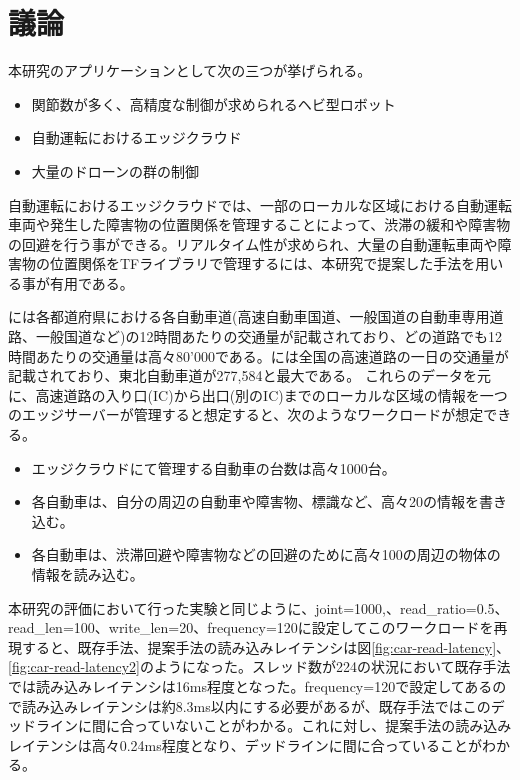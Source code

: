 \documentclass[a4paper]{jreport}	%
\begin{document}
\chapter{議論}
本研究のアプリケーションとして次の三つが挙げられる。
\begin{itemize}
	\item 関節数が多く、高精度な制御が求められるヘビ型ロボット
	\item 自動運転におけるエッジクラウド
	\item 大量のドローンの群の制御
\end{itemize}

自動運転におけるエッジクラウドでは、一部のローカルな区域における自動運転車両や発生した障害物の位置関係を管理することによって、渋滞の緩和や障害物の回避を行う事ができる。リアルタイム性が求められ、大量の自動運転車両や障害物の位置関係をTFライブラリで管理するには、本研究で提案した手法を用いる事が有用である。

\cite{nexco}には各都道府県における各自動車道(高速自動車国道、一般国道の自動車専用道路、一般国道など)の12時間あたりの交通量が記載されており、どの道路でも12時間あたりの交通量は高々80’000である。\cite{load}には全国の高速道路の一日の交通量が記載されており、東北自動車道が277,584と最大である。
これらのデータを元に、高速道路の入り口(IC)から出口(別のIC)までのローカルな区域の情報を一つのエッジサーバーが管理すると想定すると、次のようなワークロードが想定できる。

\begin{itemize}
	\item エッジクラウドにて管理する自動車の台数は高々1000台。
	\item 各自動車は、自分の周辺の自動車や障害物、標識など、高々20の情報を書き込む。
	\item 各自動車は、渋滞回避や障害物などの回避のために高々100の周辺の物体の情報を読み込む。
\end{itemize}

本研究の評価において行った実験と同じように、joint=1000,、read\_ratio=0.5、read\_len=100、write\_len=20、frequency=120に設定してこのワークロードを再現すると、既存手法、提案手法の読み込みレイテンシは図\ref{fig:car-read-latency}、\ref{fig:car-read-latency2}のようになった。スレッド数が224の状況において既存手法では読み込みレイテンシは16ms程度となった。frequency=120で設定してあるので読み込みレイテンシは約8.3ms以内にする必要があるが、既存手法ではこのデッドラインに間に合っていないことがわかる。これに対し、提案手法の読み込みレイテンシは高々0.24ms程度となり、デッドラインに間に合っていることがわかる。
\end{document}
